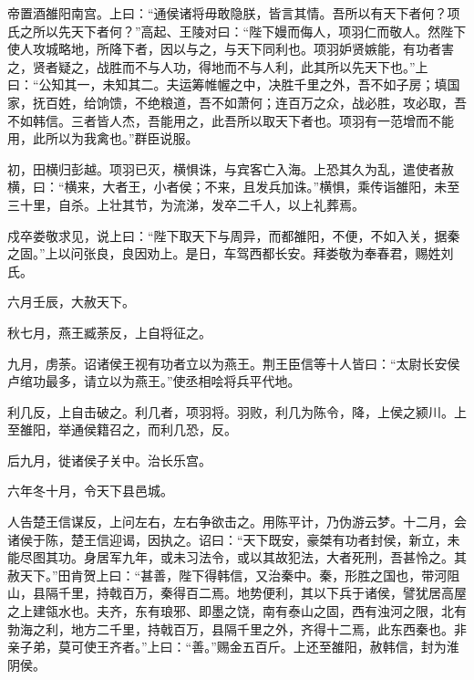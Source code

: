 \documentclass[12pt,UTF8]{ctexbook}
\begin{document}
帝置酒雒阳南宫。上曰：“通侯诸将毋敢隐朕，皆言其情。吾所以有天下者何？项氏之所以先天下者何？”高起、王陵对曰：“陛下嫚而侮人，项羽仁而敬人。然陛下使人攻城略地，所降下者，因以与之，与天下同利也。项羽妒贤嫉能，有功者害之，贤者疑之，战胜而不与人功，得地而不与人利，此其所以先天下也。”上曰：“公知其一，未知其二。夫运筹帷幄之中，决胜千里之外，吾不如子房；填国家，抚百姓，给饷馈，不绝粮道，吾不如萧何；连百万之众，战必胜，攻必取，吾不如韩信。三者皆人杰，吾能用之，此吾所以取天下者也。项羽有一范增而不能用，此所以为我禽也。”群臣说服。



初，田横归彭越。项羽已灭，横惧诛，与宾客亡入海。上恐其久为乱，遣使者赦横，曰：“横来，大者王，小者侯；不来，且发兵加诛。”横惧，乘传诣雒阳，未至三十里，自杀。上壮其节，为流涕，发卒二千人，以上礼葬焉。



戍卒娄敬求见，说上曰：“陛下取天下与周异，而都雒阳，不便，不如入关，据秦之固。”上以问张良，良因劝上。是日，车驾西都长安。拜娄敬为奉春君，赐姓刘氏。



六月壬辰，大赦天下。



秋七月，燕王臧荼反，上自将征之。



九月，虏荼。诏诸侯王视有功者立以为燕王。荆王臣信等十人皆曰：“太尉长安侯卢绾功最多，请立以为燕王。”使丞相哙将兵平代地。



利几反，上自击破之。利几者，项羽将。羽败，利几为陈令，降，上侯之颍川。上至雒阳，举通侯籍召之，而利几恐，反。



后九月，徙诸侯子关中。治长乐宫。



六年冬十月，令天下县邑城。



人告楚王信谋反，上问左右，左右争欲击之。用陈平计，乃伪游云梦。十二月，会诸侯于陈，楚王信迎谒，因执之。诏曰：“天下既安，豪桀有功者封侯，新立，未能尽图其功。身居军九年，或未习法令，或以其故犯法，大者死刑，吾甚怜之。其赦天下。”田肯贺上曰：“甚善，陛下得韩信，又治秦中。秦，形胜之国也，带河阻山，县隔千里，持戟百万，秦得百二焉。地势便利，其以下兵于诸侯，譬犹居高屋之上建瓴水也。夫齐，东有琅邪、即墨之饶，南有泰山之固，西有浊河之限，北有勃海之利，地方二千里，持戟百万，县隔千里之外，齐得十二焉，此东西秦也。非亲子弟，莫可使王齐者。”上曰：“善。”赐金五百斤。上还至雒阳，赦韩信，封为淮阴侯。
\end{document}
